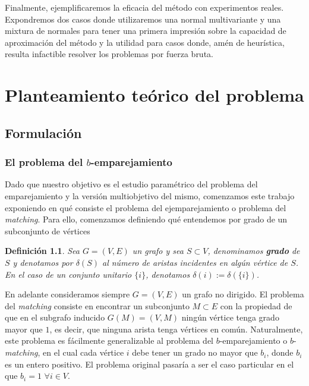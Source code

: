 \documentclass[twoside,a4paper,openright,12pt]{book}
\newtheorem{defi}{Definici\'on}[section]
\begin{document}
Finalmente, ejemplificaremos la eficacia del método con experimentos reales. Expondremos dos casos donde utilizaremos una normal multivariante y una mixtura de normales para tener una primera impresión sobre la capacidad de aproximación del método y la utilidad para casos donde, amén de heurística, resulta infactible resolver los problemas por fuerza bruta.


\newpage
\thispagestyle{empty}
\chapter{Planteamiento teórico del problema}
\section{Formulación}
\subsection{El problema del $b$-emparejamiento}
Dado que nuestro objetivo es el estudio paramétrico del problema del emparejamiento y la versión multiobjetivo del mismo, comenzamos este trabajo exponiendo en qué consiste el problema del ejemparejamiento o problema del \textit{matching}. Para ello, comenzamos definiendo qué entendemos por grado de un subconjunto de vértices
\begin{defi}
Sea $G=(V,E)$ un grafo y sea $S \subset V$, denominamos \textbf{grado} de $S$ y denotamos por $\delta(S)$ al número de aristas incidentes en algún vértice de $S$. En el caso de un conjunto unitario $\{i\}$, denotamos $\delta(i):=\delta(\{i\})$. 
\end{defi}
En adelante consideramos siempre $G=(V,E)$ un grafo no dirigido. El problema del \textit{matching} consiste en encontrar un subconjunto $M\subset E$ con la propiedad de que en el subgrafo inducido $G(M)=(V,M)$ ningún vértice tenga grado mayor que $1$, es decir, que ninguna arista tenga vértices en común. Naturalmente, este problema es fácilmente generalizable al problema del $b$-emparejamiento o $b$-\textit{matching}, en el cual cada vértice $i$ debe tener un grado no mayor que $b_i$, donde $b_i$ es un entero positivo. El problema original pasaría a ser el caso particular en el que $b_i = 1$ $\forall i \in V$.
\end{document}

